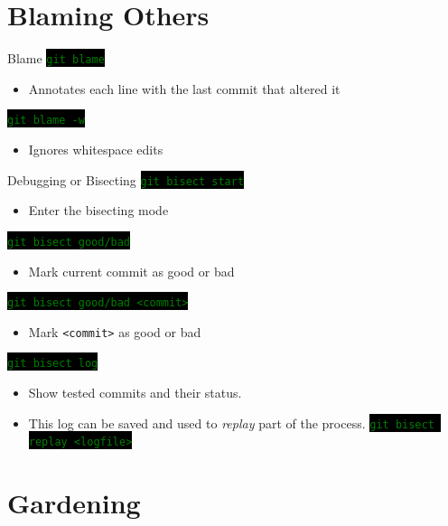 \documentclass[
14pt,
aspectratio=169,
usenames,
dvipsnames,
x11names]{beamer}
\newcommand{\code}[1]{{\small\setlength{\fboxsep}{2pt}\colorbox{black}{\textcolor{green}{\texttt{#1}}}}}
\begin{document}
\section{Blaming Others}

\begin{frame}{Blame}
  \code{git blame}
  \begin{itemize}
  \item Annotates each line with the last commit that altered it
  \end{itemize}

  \vfill
  \pause

  \code{git blame -w}
  \begin{itemize}
  \item Ignores whitespace edits
  \end{itemize}
\end{frame}

\begin{frame}{Debugging or Bisecting}
  \code{git bisect start}
  \begin{itemize}
  \item Enter the bisecting mode
  \end{itemize}

  \vfill
  \pause

  \code{git bisect good/bad}
  \begin{itemize}
  \item Mark current commit as good or bad
  \end{itemize}

  \vfill
  \pause

  \code{git bisect good/bad <commit>}
  \begin{itemize}
  \item Mark \texttt{<commit>} as good or bad
  \end{itemize}

  \vfill
  \pause

  \code{git bisect log}
  \begin{itemize}
  \item Show tested commits and their status.
  \item This log can be saved and used to \textit{replay} part of the process.
    \code{git bisect replay <logfile>}
  \end{itemize}
\end{frame}

\section{Gardening}
\end{document}
